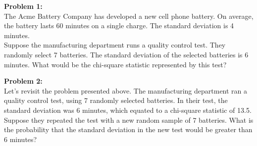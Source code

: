 \documentclass{book}
\begin{document}
\textbf{Problem 1:}
\vspace{10pt} \\
	The Acme Battery Company has developed a new cell phone battery. On average, the battery lasts 60 minutes on a single charge. The standard deviation is 4 minutes. \\

Suppose the manufacturing department runs a quality control test. They randomly select 7 batteries. The standard deviation of the selected batteries is 6 minutes. What would be the chi-square statistic represented by this test? \\
\vspace{10pt}

\textbf{Problem 2:}
\vspace{10pt} \\
Let's revisit the problem presented above. The manufacturing department ran a quality control test, using 7 randomly selected batteries. In their test, the standard deviation was 6 minutes, which equated to a chi-square statistic of 13.5. \\

Suppose they repeated the test with a new random sample of 7 batteries. What is the probability that the standard deviation in the new test would be greater than 6 minutes?
\end{document}
